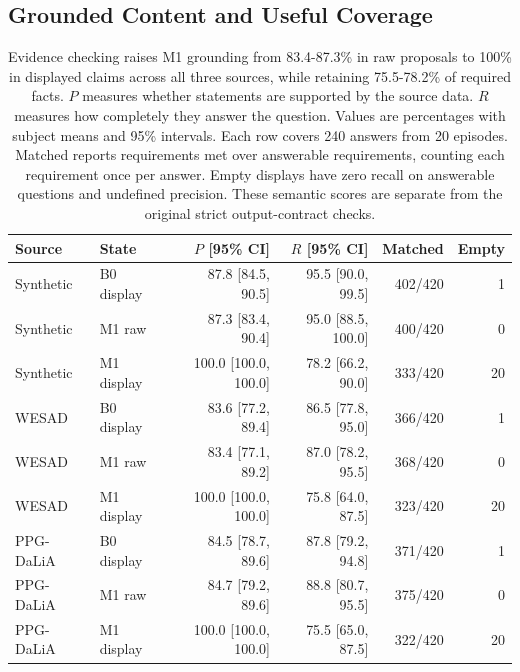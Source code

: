 \documentclass[runningheads]{llncs}
\begin{document}






\subsection{Grounded Content and Useful Coverage}

\begin{table}[!htbp]
\caption{Evidence checking raises M1 grounding from 83.4-87.3\% in raw
proposals to 100\% in displayed claims across all three sources, while
retaining 75.5-78.2\% of required facts.
$P$ measures whether statements are supported by the source data.
$R$ measures how completely they answer the question.
Values are percentages with subject means and 95\% intervals.
Each row covers 240 answers from 20 episodes.
Matched reports requirements met over answerable requirements, counting
each requirement once per answer. Empty displays have zero recall on
answerable questions and undefined precision. These semantic scores are
separate from the original strict output-contract checks.}
\label{tab:fidelity}
\centering\scriptsize\setlength{\tabcolsep}{3pt}
\begin{tabular}{llrrrr}
\toprule
Source & State & $P$ [95\% CI] & $R$ [95\% CI] & Matched & Empty \\
\midrule
Synthetic & B0 display & 87.8 [84.5, 90.5] & 95.5 [90.0, 99.5] & 402/420 & 1 \\
Synthetic & M1 raw & 87.3 [83.4, 90.4] & 95.0 [88.5, 100.0] & 400/420 & 0 \\
Synthetic & M1 display & 100.0 [100.0, 100.0] & 78.2 [66.2, 90.0] & 333/420 & 20 \\
WESAD & B0 display & 83.6 [77.2, 89.4] & 86.5 [77.8, 95.0] & 366/420 & 1 \\
WESAD & M1 raw & 83.4 [77.1, 89.2] & 87.0 [78.2, 95.5] & 368/420 & 0 \\
WESAD & M1 display & 100.0 [100.0, 100.0] & 75.8 [64.0, 87.5] & 323/420 & 20 \\
PPG-DaLiA & B0 display & 84.5 [78.7, 89.6] & 87.8 [79.2, 94.8] & 371/420 & 1 \\
PPG-DaLiA & M1 raw & 84.7 [79.2, 89.6] & 88.8 [80.7, 95.5] & 375/420 & 0 \\
PPG-DaLiA & M1 display & 100.0 [100.0, 100.0] & 75.5 [65.0, 87.5] & 322/420 & 20 \\
\bottomrule
\end{tabular}
\space%
 \end{table}
\end{document}
